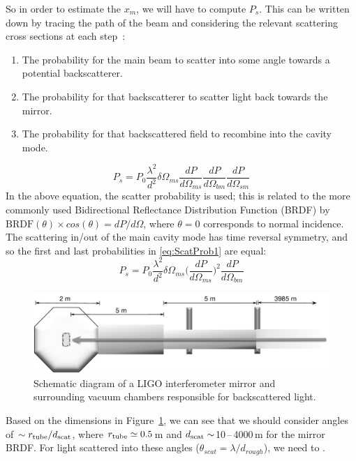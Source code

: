 So in order to estimate the $x_m$, we will have to compute $P_s$.
This can be written down by tracing the path of the beam and considering
the relevant scattering cross sections at each step~\cite{Kip:Baffles1989}:
\begin{enumerate}
\item The probability for the main beam to scatter into some angle towards a potential backscatterer.
\item The probability for that backscatterer to scatter light back towards the mirror.
\item The probability for that backscattered field to recombine into the cavity mode.
\end{enumerate}
\begin{equation}
P_s = P_0 \frac{\lambda^2}{d^2} \delta \Omega_{ms} \frac{dP}{d\Omega_{ms}} \frac{dP}{d\Omega_{bm}} \frac{dP}{d\Omega_{sm}}
\label{eq:ScatProb1}
\end{equation}
In the above equation, the scatter probability is used; this is related to the
more commonly used Bidirectional Reflectance Distribution Function (BRDF) by
$ \mathrm{BRDF}(\theta) \times cos(\theta) = dP/d\Omega$, where $\theta = 0$
corresponds to normal incidence.
The scattering in/out of the main cavity mode has time reversal symmetry,
and so the first and last probabilities in \eqref{eq:ScatProb1} are equal:
\begin{equation}
P_s = P_0 \frac{\lambda^2}{d^2} \delta \Omega_{ms}
\bigg(\frac{dP}{d\Omega_{ms}}\bigg)^2 \frac{dP}{d\Omega_{bm}}
\label{eq:ScatProb2}
\end{equation}

\begin{figure}[h]
  \centering
    \includegraphics[width=\columnwidth]{Figures/ETM_scatter-BW.pdf}
    \caption{Schematic diagram of a LIGO interferometer mirror and
    surrounding vacuum chambers responsible for backscattered light.}
    \label{fig:ETMscat}
\end{figure}

Based on the dimensions in Figure~\ref{fig:ETMscat}, we can see that
we should consider angles of $\sim r_{\rm tube}/d_{\rm scat}$, where
$r_{\rm tube} \simeq 0.5$\,m and $d_{\rm scat} \sim$10\,--\,4000\,m
for the mirror BRDF. For light scattered into these angles
($\theta_{scat} = \lambda / d_{rough}$), we need to .

